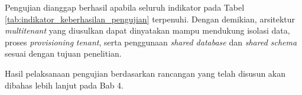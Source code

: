 Pengujian dianggap berhasil apabila seluruh indikator pada Tabel \ref{tab:indikator_keberhasilan_pengujian} terpenuhi. Dengan demikian, arsitektur \textit{multitenant} yang diusulkan dapat dinyatakan mampu mendukung isolasi data, proses \textit{provisioning} \textit{tenant}, serta penggunaan \textit{shared database} dan \textit{shared schema} sesuai dengan tujuan penelitian.

Hasil pelaksanaan pengujian berdasarkan rancangan yang telah disusun akan dibahas lebih lanjut pada Bab 4.
